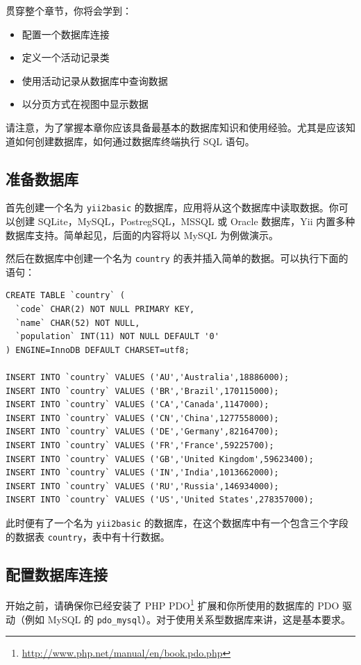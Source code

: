 贯穿整个章节，你将会学到：

\begin{itemize}
\item 配置一个数据库连接
\item 定义一个活动记录类
\item 使用活动记录从数据库中查询数据
\item 以分页方式在视图中显示数据
\end{itemize}
请注意，为了掌握本章你应该具备最基本的数据库知识和使用经验。尤其是应该知道如何创建数据库，如何通过数据库终端执行 SQL 语句。

\subsection{准备数据库 \label{start-databases.md::preparing-database}}
首先创建一个名为 \lstinline|yii2basic| 的数据库，应用将从这个数据库中读取数据。你可以创建 SQLite，MySQL，PostregSQL，MSSQL 或 Oracle 数据库，Yii 内置多种数据库支持。简单起见，后面的内容将以 MySQL 为例做演示。

然后在数据库中创建一个名为 \lstinline|country| 的表并插入简单的数据。可以执行下面的语句：

\lstset{language=sql}\begin{lstlisting}
CREATE TABLE `country` (
  `code` CHAR(2) NOT NULL PRIMARY KEY,
  `name` CHAR(52) NOT NULL,
  `population` INT(11) NOT NULL DEFAULT '0'
) ENGINE=InnoDB DEFAULT CHARSET=utf8;

INSERT INTO `country` VALUES ('AU','Australia',18886000);
INSERT INTO `country` VALUES ('BR','Brazil',170115000);
INSERT INTO `country` VALUES ('CA','Canada',1147000);
INSERT INTO `country` VALUES ('CN','China',1277558000);
INSERT INTO `country` VALUES ('DE','Germany',82164700);
INSERT INTO `country` VALUES ('FR','France',59225700);
INSERT INTO `country` VALUES ('GB','United Kingdom',59623400);
INSERT INTO `country` VALUES ('IN','India',1013662000);
INSERT INTO `country` VALUES ('RU','Russia',146934000);
INSERT INTO `country` VALUES ('US','United States',278357000);
\end{lstlisting}
此时便有了一个名为 \lstinline|yii2basic| 的数据库，在这个数据库中有一个包含三个字段的数据表 \lstinline|country|，表中有十行数据。

\subsection{配置数据库连接 \label{start-databases.md::configuring-db-connection}}
开始之前，请确保你已经安装了 PHP PDO\footnote{\url{http://www.php.net/manual/en/book.pdo.php}} 扩展和你所使用的数据库的 PDO 驱动（例如 MySQL 的 \lstinline|pdo_mysql|）。对于使用关系型数据库来讲，这是基本要求。

